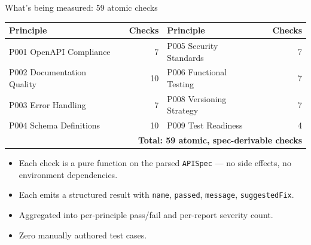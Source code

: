 \documentclass[10pt,aspectratio=169]{beamer}
\begin{document}
\begin{frame}{What's being measured: 59 atomic checks}

\begin{center}
\small
\begin{tabular}{@{}lcr@{\hskip 2em}lcr@{}}
\textbf{Principle} & & \textbf{Checks} & \textbf{Principle} & & \textbf{Checks} \\
\hline
P001 OpenAPI Compliance      & & 7  & P005 Security Standards   & & 7 \\
P002 Documentation Quality   & & 10 & P006 Functional Testing   & & 7 \\
P003 Error Handling          & & 7  & P008 Versioning Strategy  & & 7 \\
P004 Schema Definitions      & & 10 & P009 Test Readiness       & & 4 \\
\hline
\multicolumn{6}{r}{\textbf{Total: 59 atomic, spec-derivable checks}}
\end{tabular}
\end{center}

\vspace{1em}
\footnotesize
\begin{itemize}\setlength\itemsep{0.3em}
\item Each check is a pure function on the parsed \texttt{APISpec} ---
  no side effects, no environment dependencies.
\item Each emits a structured result with \texttt{name},
  \texttt{passed}, \texttt{message}, \texttt{suggestedFix}.
\item Aggregated into per-principle pass/fail and per-report severity
  count.
\item \alert{Zero manually authored test cases.}
\end{itemize}

\end{frame}

\end{document}
